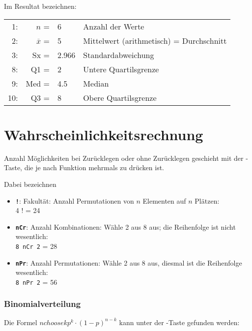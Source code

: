 Im Resultat bezeichnen:

\begin{tabular}{r|r l|p{9cm}}
 1: & $n$            = & 6     & Anzahl der Werte\\
 2: & $\overline{x}$ = & 5     & Mittelwert (arithmetisch) = Durchschnitt\\
 3: & Sx             = & 2.966 & Standardabweichung \\
 8: & Q1             = & 2     & Untere Quartilsgrenze \\
 9: & Med            = & 4.5   & Median \\
10: & Q3             = & 8     & Obere Quartilsgrenze \\


\end{tabular}
\newpage

\section{Wahrscheinlichkeitsrechnung}\label{wahrscheinlichkeitsrechnung}
Anzahl Möglichkeiten bei Zurücklegen oder ohne Zurücklegen geschieht mit der -Taste, die je nach Funktion mehrmals zu drücken ist. 

Dabei bezeichnen

\begin{itemize}
\item \texttt{\textbf{!}}: Fakultät: Anzahl Permutationen von $n$ Elementen auf $n$ Plätzen:\\
4 ! = 24

\item \texttt{\textbf{nCr}}: Anzahl Kombinationen: Wähle 2 aus 8 aus; die Reihenfolge ist nicht wesentlich:\\
\texttt{8 nCr 2} = 28

\item \texttt{\textbf{nPr}}: Anzahl Permutationen: Wähle 2 aus 8 aus, diesmal ist die Reihenfolge wesentlich:\\
\texttt{8 nPr 2} = 56
\end{itemize}

\subsubsection{Binomialverteilung}
Die Formel ${n choose k}p^k\cdot{}(1-p)^{n-k}$ kann unter der  -Taste gefunden werden:

